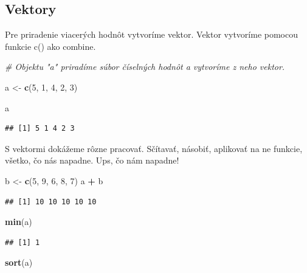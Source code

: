 \documentclass[]{article}
\newenvironment{Shaded}{\begin{snugshade}}{\end{snugshade}}
\newcommand{\CommentTok}[1]{\textcolor[rgb]{0.56,0.35,0.01}{\textit{#1}}}
\newcommand{\DecValTok}[1]{\textcolor[rgb]{0.00,0.00,0.81}{#1}}
\newcommand{\KeywordTok}[1]{\textcolor[rgb]{0.13,0.29,0.53}{\textbf{#1}}}
\newcommand{\NormalTok}[1]{#1}
\newcommand{\OperatorTok}[1]{\textcolor[rgb]{0.81,0.36,0.00}{\textbf{#1}}}
\newcommand{\StringTok}[1]{\textcolor[rgb]{0.31,0.60,0.02}{#1}}
\begin{document}
\newpage

\hypertarget{vektory}{%
\subsection{Vektory}\label{vektory}}

Pre priradenie viacerých hodnôt vytvoríme vektor. Vektor vytvoríme
pomocou funkcie c() ako combine.

\begin{Shaded}
\begin{Highlighting}[]
\CommentTok{# Objektu "a" priradíme súbor číselných hodnôt a vytvoríme z neho vektor.}

\NormalTok{a <-}\StringTok{ }\KeywordTok{c}\NormalTok{(}\DecValTok{5}\NormalTok{, }\DecValTok{1}\NormalTok{, }\DecValTok{4}\NormalTok{, }\DecValTok{2}\NormalTok{, }\DecValTok{3}\NormalTok{)}

\NormalTok{a}
\end{Highlighting}
\end{Shaded}

\begin{verbatim}
## [1] 5 1 4 2 3
\end{verbatim}

S vektormi dokážeme rôzne pracovať. Sčítavať, násobiť, aplikovať na ne
funkcie, všetko, čo nás napadne. Ups, čo nám napadne!

\begin{Shaded}
\begin{Highlighting}[]
\NormalTok{b <-}\StringTok{ }\KeywordTok{c}\NormalTok{(}\DecValTok{5}\NormalTok{, }\DecValTok{9}\NormalTok{, }\DecValTok{6}\NormalTok{, }\DecValTok{8}\NormalTok{, }\DecValTok{7}\NormalTok{)}
\NormalTok{a }\OperatorTok{+}\StringTok{ }\NormalTok{b}
\end{Highlighting}
\end{Shaded}

\begin{verbatim}
## [1] 10 10 10 10 10
\end{verbatim}

\begin{Shaded}
\begin{Highlighting}[]
\KeywordTok{min}\NormalTok{(a)}
\end{Highlighting}
\end{Shaded}

\begin{verbatim}
## [1] 1
\end{verbatim}

\begin{Shaded}
\begin{Highlighting}[]
\KeywordTok{sort}\NormalTok{(a)}
\end{Highlighting}
\end{Shaded}
\end{document}
